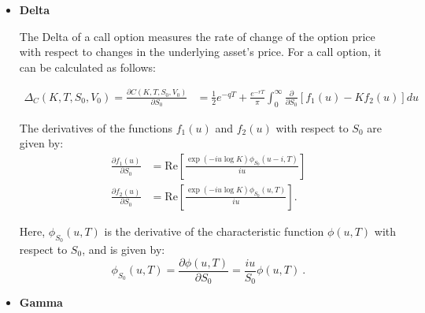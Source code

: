 \begin{itemize}

\item \textbf{Delta} 

The Delta of a call option measures the rate of change of the option price with respect to changes in the underlying asset's price. For a call option, it can be calculated as follows:

$$
\begin{aligned}
\Delta_C(K,T, S_0, V_0) = \frac{ \partial C(K,T, S_0, V_0) }{\partial S_0} &=
 \frac{1}{2}e^{-q T} + \frac{e^{-r T}}{\pi} \int_0^{\infty}\frac{ \partial  }{\partial S_0}  \left[f_1(u) - Kf_2(u)\right]du
\end{aligned}
$$

The derivatives of the functions $f_1(u)$ and $f_2(u)$ with respect to $S_0$ are given by:
\begin{equation}
\label{eq:derivative-s0-f1-f2}
\begin{aligned}
\frac{ \partial  f_1(u)   }{\partial S_0}&= \mathrm{Re}\left[  \frac{\exp(-iu\log K) \phi_{S_0}(u-i,T)   }{iu}\right]   \\  
\frac{\partial f_2(u)   }{\partial S_0} &= \mathrm{Re}\left[ \frac{\exp(-iu\log K) \phi_{S_0}(u,T)  }{iu}\right].
\end{aligned}
\end{equation}

Here, $\phi_{S_0}(u,T)$ is the derivative of the characteristic function $\phi(u,T)$ with respect to $S_0$, and is given by:
$$
\phi_{S_0}(u,T) = \frac{ \partial  \phi(u,T)}{\partial S_0} = \frac{iu}{S_0} \phi(u,T) \ . 
$$


\item \textbf{Gamma} 


\end{itemize}
